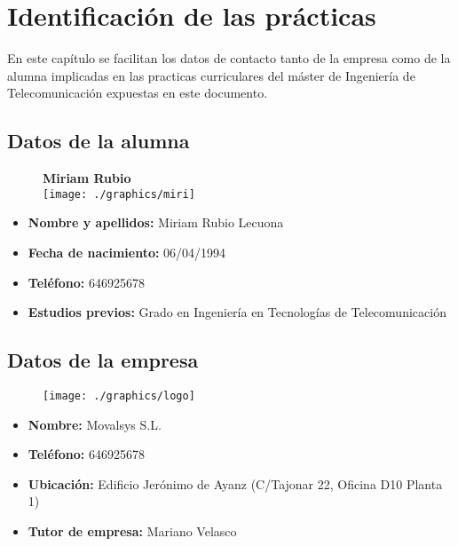 \chapter{Identificación de las prácticas}

	En este capítulo se facilitan los datos de contacto tanto de la empresa como de la alumna implicadas en las practicas curriculares del máster de Ingeniería de Telecomunicación expuestas en este documento. 

	\section{Datos de la alumna}
		\begin{figure}[H]
			\centering
			{\large \textbf{Miriam Rubio}\\}\smallskip
			\texttt{[image: ./graphics/miri]}	
		\end{figure}
	
		\begin{itemize}
			
			\item \textbf{Nombre y apellidos:} Miriam Rubio Lecuona
			\item \textbf{Fecha de nacimiento:} 06/04/1994
			\item \textbf{Teléfono:} 646925678
			\item \textbf{Estudios previos:} Grado en Ingeniería en Tecnologías de Telecomunicación
			
		\end{itemize}
		\bigskip
	\section{Datos de la empresa}
		\begin{figure}[H]
			\centering
			\texttt{[image: ./graphics/logo]}	
		\end{figure}
		
		\begin{itemize}
	
			\item \textbf{Nombre:} Movalsys S.L.
			\item \textbf{Teléfono:} 646925678
			\item \textbf{Ubicación:} Edificio Jerónimo de Ayanz (C/Tajonar 22, Oficina D10 Planta 1)
			\item \textbf{Tutor de empresa:} Mariano Velasco
				
		\end{itemize}
		\bigskip